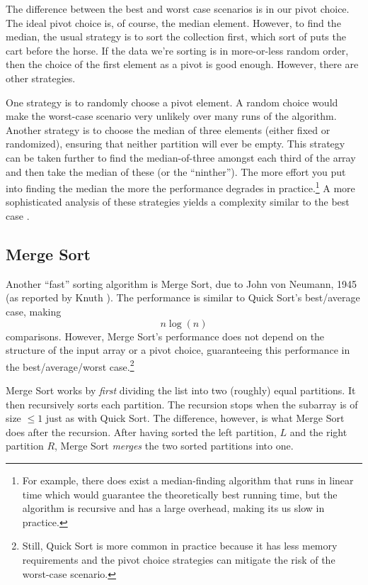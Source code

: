 The difference between the best and worst case scenarios is in our pivot
choice.  The ideal pivot choice is, of course, the median element.  However,
to find the median, the usual strategy is to sort the collection first, 
which sort of puts the cart before the horse.  If the data we're sorting is
in more-or-less random order, then the choice of the first element as a
pivot is good enough.  However, there are other strategies.

One strategy is to randomly choose a pivot element.  A random choice 
would make the worst-case scenario very unlikely over many runs of the
algorithm.  Another strategy is to choose the median of three elements 
(either fixed or randomized), ensuring that neither partition will ever
be empty.  This strategy can be taken further to find the 
median-of-three amongst each third of the array and then take the median
of these (or the ``ninther'').  The more effort you put into finding the
median the more the performance degrades in practice.\footnote{For
example, there does exist a median-finding algorithm that runs in
linear time which would guarantee the theoretically best running time, but
the algorithm is recursive and has a large overhead, making its us
slow in practice.}  A more sophisticated analysis of these strategies
yields a complexity similar to the best case \cite{Bentley:1993:ESF:172704.172710}.

\subsection{Merge Sort}

Another ``fast'' sorting algorithm is Merge Sort, due to John von 
Neumann, 1945 (as reported by Knuth \cite{Knuth:1970:VNF:356580.356581}).
The performance is similar to Quick Sort's best/average case, making
  $$n \log{(n)}$$
comparisons.  However, Merge Sort's performance does not depend on the
structure of the input array or a pivot choice, guaranteeing this performance
in the best/average/worst case.\footnote{Still, Quick Sort is more common
in practice because it has less memory requirements and the pivot choice
strategies can mitigate the risk of the worst-case scenario.}

Merge Sort works by \emph{first} dividing the list into two (roughly) 
equal partitions.  It then recursively sorts each partition.  The
recursion stops when the subarray is of size $\leq 1$ just as with Quick
Sort.  The difference, however, is what Merge Sort does after the
recursion.  After having sorted the left partition, $L$ and the right
partition $R$, Merge Sort \emph{merges} the two sorted partitions into
one.

